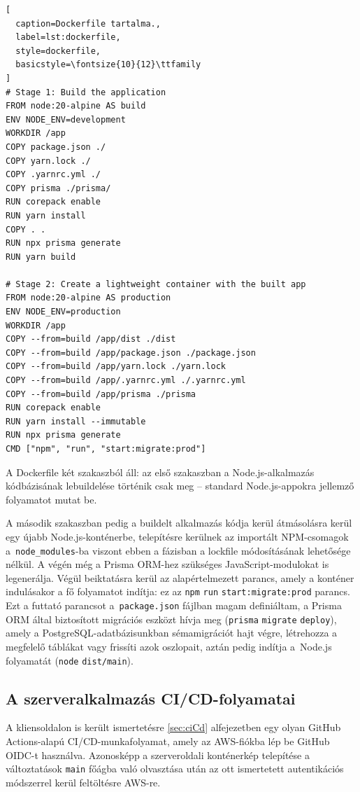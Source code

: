 \begin{minipage}{0.92\textwidth}
  \begin{lstlisting}[
  caption=Dockerfile tartalma.,
  label=lst:dockerfile,
  style=dockerfile,
  basicstyle=\fontsize{10}{12}\ttfamily
]
# Stage 1: Build the application
FROM node:20-alpine AS build
ENV NODE_ENV=development
WORKDIR /app
COPY package.json ./
COPY yarn.lock ./
COPY .yarnrc.yml ./
COPY prisma ./prisma/
RUN corepack enable
RUN yarn install
COPY . .
RUN npx prisma generate
RUN yarn build

# Stage 2: Create a lightweight container with the built app
FROM node:20-alpine AS production
ENV NODE_ENV=production
WORKDIR /app
COPY --from=build /app/dist ./dist
COPY --from=build /app/package.json ./package.json
COPY --from=build /app/yarn.lock ./yarn.lock
COPY --from=build /app/.yarnrc.yml ./.yarnrc.yml
COPY --from=build /app/prisma ./prisma
RUN corepack enable
RUN yarn install --immutable
RUN npx prisma generate
CMD ["npm", "run", "start:migrate:prod"]
\end{lstlisting}
\end{minipage}

A Dockerfile két szakaszból áll: az első szakaszban a Node.js-alkalmazás kódbázisának lebuildelése történik csak meg -- standard Node.js-appokra jellemző folyamatot mutat be.

A második szakaszban pedig a buildelt alkalmazás kódja kerül átmásolásra kerül egy újabb Node.js\leavevmode\hbox{-}konténerbe, telepítésre kerülnek az importált NPM-csomagok a~\verb|node_modules|-ba viszont ebben a fázisban a lockfile módosításának lehetősége nélkül. A végén még a Prisma ORM-hez szükséges JavaScript-modulokat is legenerálja. Végül beiktatásra kerül az alapértelmezett parancs, amely a konténer indulásakor a fő folyamatot indítja: ez az \verb|npm| \verb|run| \verb|start:migrate:prod| parancs. Ezt a futtató parancsot a~\verb|package.json| fájlban magam definiáltam, a Prisma ORM által biztosított migrációs eszközt hívja meg (\verb|prisma| \verb|migrate| \verb|deploy|), amely a PostgreSQL-adatbázisunkban sémamigrációt hajt végre, létrehozza a megfelelő táblákat vagy frissíti azok oszlopait, aztán pedig indítja a~Node.js folyamatát (\verb|node| \verb|dist/main|).

\subsection{A szerveralkalmazás CI/CD-folyamatai}

A kliensoldalon is került ismertetésre \ref{sec:ciCd} alfejezetben egy olyan GitHub Actions-alapú CI/CD-munkafolyamat, amely az AWS-fiókba lép be GitHub OIDC-t használva. Azonosképp a szerveroldali konténerkép telepítése a változtatások \verb|main| főágba való olvasztása után az ott ismertetett autentikációs módszerrel kerül feltöltésre AWS-re.

